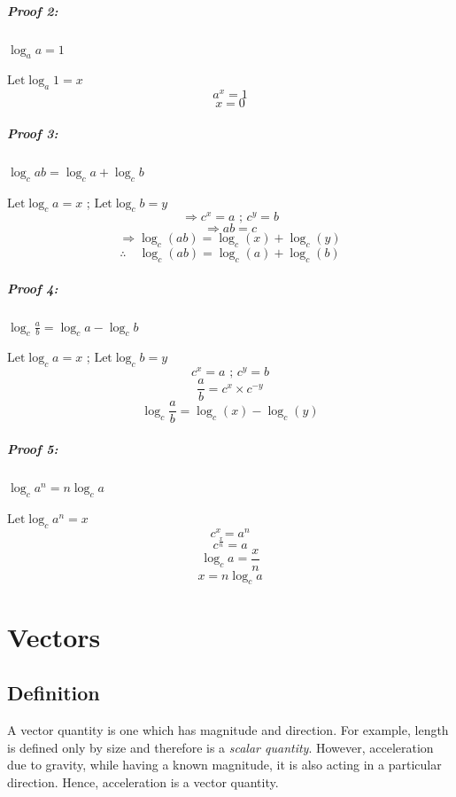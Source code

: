 \documentclass[12pt, a4paper]{report}
\theoremstyle{definition}
\begin{document}
	\paragraph{Proof 2: }$\log_aa  = 1$
	\begin{center}
		$	\text{Let} \log_a1 = x$
		$$   a^x      = 1 $$
		$$x        = 0$$
	\end{center}
	\paragraph{Proof 3: }$\log_cab  = \log_ca + \log_cb$
	\begin{center}
		$	\text{Let} \log_ca = x$ ; $\text{Let} \log_cb = y$
		$$\Rightarrow  c^{x} = a  \text{ ; } c^{y} = b$$
		$$\Rightarrow ab = c $$
		$$\Rightarrow\log_c(ab) = \log_c(x) + \log_c(y)$$
		$$\therefore\quad \log_c(ab) = \log_c(a) + \log_c(b)$$
	\end{center}
	\paragraph{Proof 4: }$\log_c\frac{a}{b}  = \log_ca - \log_cb$
	\begin{center}
		$	\text{Let} \log_ca = x$ ; $\text{Let} \log_cb = y$
		$$  c^{x} = a  \text{ ; } c^{y} = b$$
		$$\frac{a}{b} = c^x \times c^{-y} $$
		$$\log_c\frac{a}{b} = \log_c(x) - \log_c(y)$$
	\end{center}
	\paragraph{Proof 5: }$\log_ca^n = n\log_ca$
	\begin{center}
		$	\text{Let} \log_ca^n = x$
		$$ c^x = a^n$$
		$$c^{\frac{x}{n}} = a  $$
		$$\log_ca = \frac{x}{n}$$
		$$x = n\log_ca $$
	\end{center}
	\chapter{Vectors}
	\section{Definition}
	\quad A vector quantity is one which has magnitude and direction. For example, length is defined only by size and therefore is a \textit{scalar quantity}. However, acceleration due to gravity, while having a known magnitude, it is also acting in a particular direction. Hence, acceleration is a vector quantity.
	
\end{document}

